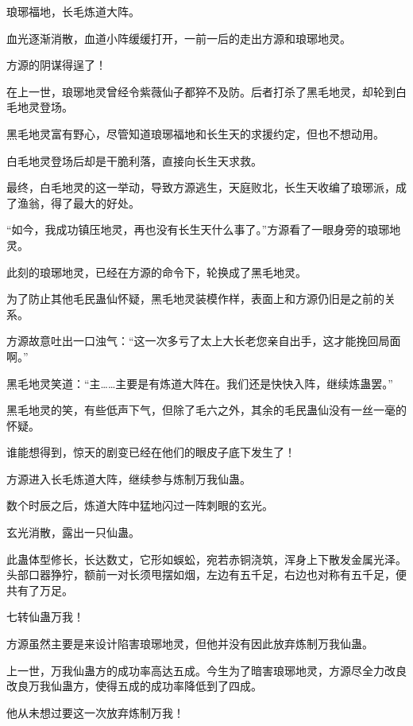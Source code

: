 
\begin{this_body}



琅琊福地，长毛炼道大阵。

血光逐渐消散，血道小阵缓缓打开，一前一后的走出方源和琅琊地灵。

方源的阴谋得逞了！

在上一世，琅琊地灵曾经令紫薇仙子都猝不及防。后者打杀了黑毛地灵，却轮到白毛地灵登场。

黑毛地灵富有野心，尽管知道琅琊福地和长生天的求援约定，但也不想动用。

白毛地灵登场后却是干脆利落，直接向长生天求救。

最终，白毛地灵的这一举动，导致方源逃生，天庭败北，长生天收编了琅琊派，成了渔翁，得了最大的好处。

“如今，我成功镇压地灵，再也没有长生天什么事了。”方源看了一眼身旁的琅琊地灵。

此刻的琅琊地灵，已经在方源的命令下，轮换成了黑毛地灵。

为了防止其他毛民蛊仙怀疑，黑毛地灵装模作样，表面上和方源仍旧是之前的关系。

方源故意吐出一口浊气：“这一次多亏了太上大长老您亲自出手，这才能挽回局面啊。”

黑毛地灵笑道：“主……主要是有炼道大阵在。我们还是快快入阵，继续炼蛊罢。”

黑毛地灵的笑，有些低声下气，但除了毛六之外，其余的毛民蛊仙没有一丝一毫的怀疑。

谁能想得到，惊天的剧变已经在他们的眼皮子底下发生了！

方源进入长毛炼道大阵，继续参与炼制万我仙蛊。

数个时辰之后，炼道大阵中猛地闪过一阵刺眼的玄光。

玄光消散，露出一只仙蛊。

此蛊体型修长，长达数丈，它形如蜈蚣，宛若赤铜浇筑，浑身上下散发金属光泽。头部口器狰狞，额前一对长须甩摆如烟，左边有五千足，右边也对称有五千足，便共有了万足。

七转仙蛊万我！

方源虽然主要是来设计陷害琅琊地灵，但他并没有因此放弃炼制万我仙蛊。

上一世，万我仙蛊方的成功率高达五成。今生为了暗害琅琊地灵，方源尽全力改良改良万我仙蛊方，使得五成的成功率降低到了四成。

他从未想过要这一次放弃炼制万我！


\end{this_body}
